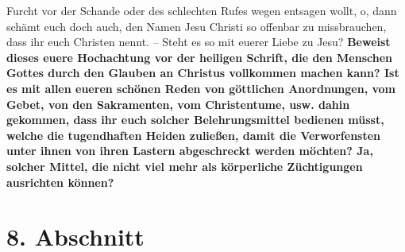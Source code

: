 Furcht vor der Schande oder des schlechten Rufes wegen entsagen wollt, o, dann
schämt euch doch auch, den Namen Jesu Christi so offenbar zu missbrauchen, dass
ihr euch Christen nennt. -- Steht es so mit euerer Liebe zu Jesu?
\textbf{Beweist dieses
euere Hochachtung vor der heiligen Schrift, die den
Menschen Gottes durch den
Glauben an Christus vollkommen machen kann? Ist es mit allen eueren schönen
Reden von göttlichen Anordnungen, vom Gebet, von den
Sakramenten, vom
Christentume, usw. dahin gekommen, dass ihr euch solcher Belehrungsmittel
bedienen müsst, welche die tugendhaften Heiden zuließen, damit die
Verworfensten unter ihnen von ihren Lastern abgeschreckt werden möchten? Ja,
solcher Mittel, die nicht viel mehr als körperliche Züchtigungen ausrichten
können?}
\label{ref:17_07_einwand_ende}

\section{8. Abschnitt} \label{kap17_ab8}

